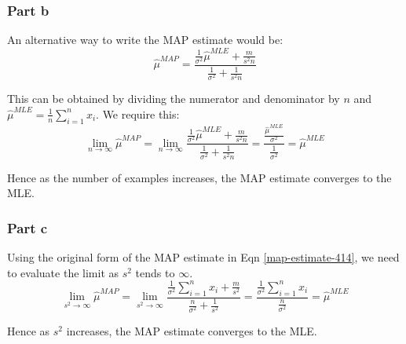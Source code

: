 \documentclass{article}
\begin{document}
\subsubsection*{Part b}
\begin{flushleft}
An alternative way to write the MAP estimate would be:
\begin{equation}
\hat{\mu}^{MAP} = \frac{\frac{1}{\sigma^2} \hat{\mu}^{MLE} + \frac{m}{s^2n}}{\frac{1}{\sigma^2} + \frac{1}{s^2n}}
\end{equation}

This can be obtained by dividing the numerator and denominator by \(n\) and \(\hat{\mu}^{MLE} = \frac{1}{n}\displaystyle\sum_{i=1}^{n}x_{i}\). We require this:
\begin{equation}
\lim_{n\to\infty} \hat{\mu}^{MAP} = \lim_{n\to\infty} \frac{\frac{1}{\sigma^2} \hat{\mu}^{MLE} + \frac{m}{s^2n}}{\frac{1}{\sigma^2} + \frac{1}{s^2n}} = \frac{\frac{\hat{\mu}^{MLE}}{\sigma^{2}}}{\frac{1}{\sigma^{2}}} = \hat{\mu}^{MLE}
\end{equation}

Hence as the number of examples increases, the MAP estimate converges to the MLE.
\end{flushleft}

\subsubsection*{Part c}
\begin{flushleft}
Using the original form of the MAP estimate in Eqn \ref{map-estimate-414}, we need to evaluate the limit as \(s^{2}\) tends to \(\infty\).
\begin{equation}
\lim_{s^{2}\to\infty} \hat{\mu}^{MAP} = \lim_{s^{2} \to \infty} \frac{\displaystyle \frac{1}{\sigma^{2}} \sum_{i=1}^{n} x_{i} + \frac{m}{s^2}}{\displaystyle \frac{n}{\sigma^{2}} + \frac{1}{s^2}} = \frac{\frac{1}{\sigma^2} \displaystyle \sum_{i=1}^{n}x_{i}}{\frac{n}{\sigma^{2}}} = \hat{\mu}^{MLE}
\end{equation}

Hence as \(s^{2}\) increases, the MAP estimate converges to the MLE.
\end{flushleft}
\end{document}
